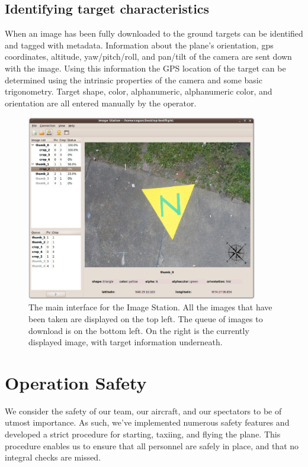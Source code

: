 \documentclass[10pt,twocolumns]{report}
\begin{document}
\subsection{Identifying target characteristics}

When an image has been fully downloaded to the ground targets can be identified and tagged with metadata.  Information about the plane's orientation, gps coordinates, altitude, yaw/pitch/roll, and pan/tilt of the camera are sent down with the image.  Using this information the GPS location of the target can be determined using the intrinsic properties of the camera and some basic trigonometry. Target shape, color, alphanumeric, alphanumeric color, and orientation are all entered manually by the operator.

\begin{figure} [h]
  \centering
  	\includegraphics[width=0.9\textwidth]{../images/ImageStationMain.jpg}
  	\caption[Image Station Interface]{The main interface for the Image Station.  All the images that have been taken are displayed on the top left.  The queue of images to download is on the bottom left.  On the right is the currently displayed image, with target information underneath.}
  	\label{fig:imagestationinterface}
\end{figure}

\section{Operation Safety}

We consider the safety of our team, our aircraft, and our spectators to be of utmost importance.  As such, we've implemented numerous safety features and developed a strict procedure for starting, taxiing, and flying the plane.  This procedure enables us to ensure that all personnel are safely in place, and that no integral checks are missed.
\end{document}

